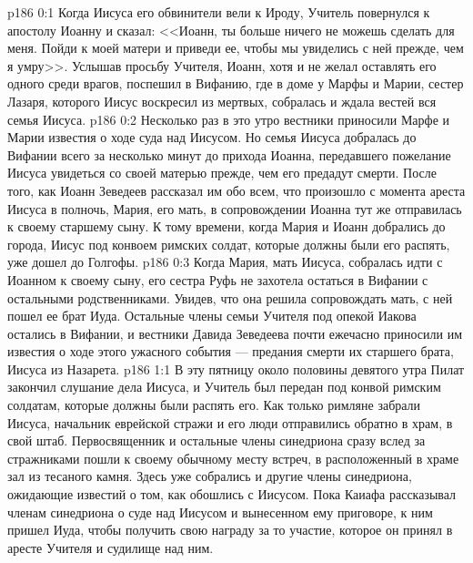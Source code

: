 \vs p186 0:1 Когда Иисуса его обвинители вели к Ироду, Учитель повернулся к апостолу Иоанну и сказал: <<Иоанн, ты больше ничего не можешь сделать для меня. Пойди к моей матери и приведи ее, чтобы мы увиделись с ней прежде, чем я умру>>. Услышав просьбу Учителя, Иоанн, хотя и не желал оставлять его одного среди врагов, поспешил в Вифанию, где в доме у Марфы и Марии, сестер Лазаря, которого Иисус воскресил из мертвых, собралась и ждала вестей вся семья Иисуса.
\vs p186 0:2 Несколько раз в это утро вестники приносили Марфе и Марии известия о ходе суда над Иисусом. Но семья Иисуса добралась до Вифании всего за несколько минут до прихода Иоанна, передавшего пожелание Иисуса увидеться со своей матерью прежде, чем его предадут смерти. После того, как Иоанн Зеведеев рассказал им обо всем, что произошло с момента ареста Иисуса в полночь, Мария, его мать, в сопровождении Иоанна тут же отправилась к своему старшему сыну. К тому времени, когда Мария и Иоанн добрались до города, Иисус под конвоем римских солдат, которые должны были его распять, уже дошел до Голгофы.
\vs p186 0:3 Когда Мария, мать Иисуса, собралась идти с Иоанном к своему сыну, его сестра Руфь не захотела остаться в Вифании с остальными родственниками. Увидев, что она решила сопровождать мать, с ней пошел ее брат Иуда. Остальные члены семьи Учителя под опекой Иакова остались в Вифании, и вестники Давида Зеведеева почти ежечасно приносили им известия о ходе этого ужасного события --- предания смерти их старшего брата, Иисуса из Назарета.
\vs p186 1:1 В эту пятницу около половины девятого утра Пилат закончил слушание дела Иисуса, и Учитель был передан под конвой римским солдатам, которые должны были распять его. Как только римляне забрали Иисуса, начальник еврейской стражи и его люди отправились обратно в храм, в свой штаб. Первосвященник и остальные члены синедриона сразу вслед за стражниками пошли к своему обычному месту встреч, в расположенный в храме зал из тесаного камня. Здесь уже собрались и другие члены синедриона, ожидающие известий о том, как обошлись с Иисусом. Пока Каиафа рассказывал членам синедриона о суде над Иисусом и вынесенном ему приговоре, к ним пришел Иуда, чтобы получить свою награду за то участие, которое он принял в аресте Учителя и судилище над ним.
